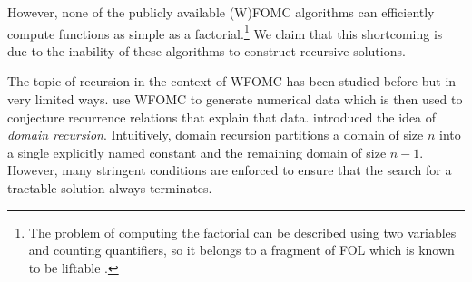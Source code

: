 
However, none of the publicly available (W)FOMC algorithms can efficiently
compute functions as simple as a factorial.\footnote{The problem of computing
  the factorial can be described using two variables and counting quantifiers,
  so it belongs to a fragment of FOL which is known to be liftable
  \citep{DBLP:journals/jair/Kuzelka21}.} We claim that this shortcoming is due
to the inability of these algorithms to construct recursive solutions.


The topic of recursion in the context of WFOMC has been studied before but in
very limited ways.  use WFOMC to generate
numerical data which is then used to conjecture recurrence relations that
explain that data.  introduced the idea of
\emph{domain recursion}. Intuitively, domain recursion partitions a domain of
size $n$ into a single explicitly named constant and the remaining domain of
size $n-1$. However, many stringent conditions are enforced to ensure that the
search for a tractable solution always terminates.



